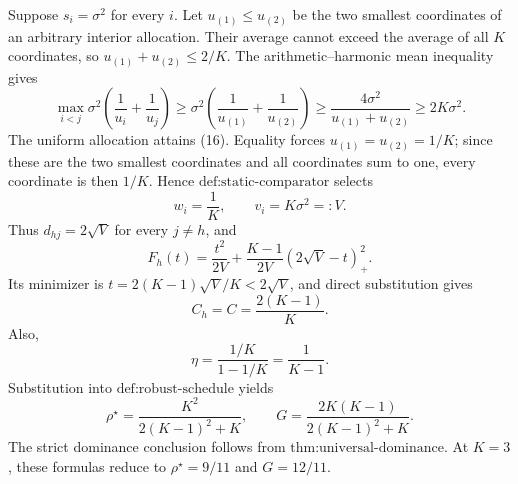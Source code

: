 Suppose \(s_i=\sigma^2\) for every \(i\). Let \(u_{(1)}\leq u_{(2)}\) be the two smallest coordinates of an arbitrary interior allocation. Their average cannot exceed the average of all \(K\) coordinates, so \(u_{(1)}+u_{(2)}\leq2/K\). The arithmetic--harmonic mean inequality gives
\[
 \max_{i<j}\sigma^2\left(\frac1{u_i}+\frac1{u_j}\right)
 \geq \sigma^2\left(\frac1{u_{(1)}}+\frac1{u_{(2)}}\right)
 \geq \frac{4\sigma^2}{u_{(1)}+u_{(2)}}
 \geq2K\sigma^2. \tag{16}
\]
The uniform allocation attains (16). Equality forces \(u_{(1)}=u_{(2)}=1/K\); since these are the two smallest coordinates and all coordinates sum to one, every coordinate is then \(1/K\). Hence \(\text{def:static-comparator}\) selects
\[
 w_i=\frac1K,\qquad v_i=K\sigma^2=:V.
\]
Thus \(d_{hj}=2\sqrt V\) for every \(j\ne h\), and
\[
 F_h(t)=\frac{t^2}{2V}
 +\frac{K-1}{2V}(2\sqrt V-t)_+^2.
\]
Its minimizer is \(t=2(K-1)\sqrt V/K<2\sqrt V\), and direct substitution gives
\[
 C_h=C=\frac{2(K-1)}K.
\]
Also,
\[
 \eta=\frac{1/K}{1-1/K}=\frac1{K-1}.
\]
Substitution into \(\text{def:robust-schedule}\) yields
\[
 \rho^\star
 =\frac{K^2}{2(K-1)^2+K},
 \qquad
 G=\frac{2K(K-1)}{2(K-1)^2+K}.
\]
The strict dominance conclusion follows from \(\text{thm:universal-dominance}\). At \(K=3\), these formulas reduce to \(\rho^\star=9/11\) and \(G=12/11\).

